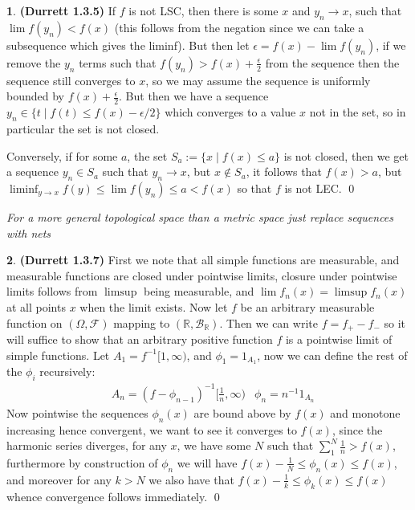 \documentclass[10.5pt]{article}
\theoremstyle{definition}
\newtheorem{pb}{}
\newcommand{\set}[1]{\{#1\}}
\begin{document}
    \begin{pb}\textbf{(Durrett 1.3.5)}
        If \(f\) is not LSC, then there is some \(x\) and \(y_n \to x\), such that \(\lim f(y_n) < f(x)\) (this follows from the negation since we can take a subsequence which gives the liminf). But then let \(\epsilon = f(x) - \lim f(y_n)\), if we remove the \(y_n\) terms such that \(f(y_n) > f(x) + \frac{\epsilon}{2}\) from the sequence then the sequence still converges to \(x\), so we may assume the sequence is uniformly bounded by \(f(x) + \frac{\epsilon}{2}\). But then we have a sequence \(y_n \in \set{t \mid f(t) \leq f(x) - \epsilon/2}\) which converges to a value \(x\) not in the set, so in particular the set is not closed.

        Conversely, if for some \(a\), the set \(S_a := \set{x \mid f(x) \leq a}\) is not closed, then we get a sequence \(y_n \in S_a\) such that \(y_n \to x\), but \(x \not \in S_a\), it follows that \(f(x) > a\), but \(\liminf_{y\to x}f(y) \leq \lim f(y_n) \leq a < f(x)\) so that \(f\) is not LEC. \qed

        \emph{For a more general topological space than a metric space just replace sequences with nets}
    \end{pb}
    \begin{pb} \textbf{(Durrett 1.3.7)}
        First we note that all simple functions are measurable, and measurable functions are closed under pointwise limits, closure under pointwise limits follows from \(\limsup\) being measurable, and \(\lim f_n(x) = \limsup f_n(x)\) at all points \(x\) when the limit exists. Now let \(f\) be an arbitrary measurable function on \((\Omega,\mathcal{F})\) mapping to \((\mathbb{R},\mathcal{B}_\mathbb{R})\). Then we can write \(f = f_+ - f_-\) so it will suffice to show that an arbitrary positive function \(f\) is a pointwise limit of simple functions. Let \(A_1 = f^{-1}[1,\infty)\), and \(\phi_1 = 1_{A_1}\), now we can define the rest of the \(\phi_i\) recursively:
        \begin{align*}
            &A_n = (f - \phi_{n-1})^{-1}[\frac{1}{n},\infty) &\phi_n = n^{-1}1_{A_n}
        \end{align*} 
        Now pointwise the sequences \(\phi_n(x)\) are bound above by \(f(x)\) and monotone increasing hence convergent, we want to see it converges to \(f(x)\), since the harmonic series diverges, for any \(x\), we have some \(N\) such that \(\sum_1^N \frac{1}{n} > f(x)\), furthermore by construction of \(\phi_n\) we will have \(f(x) - \frac{1}{N} \leq \phi_n(x) \leq f(x)\), and moreover for any \(k > N\) we also have that \(f(x) - \frac{1}{k} \leq \phi_k(x) \leq f(x)\) whence convergence follows immediately. \qed
    \end{pb}
\end{document}

